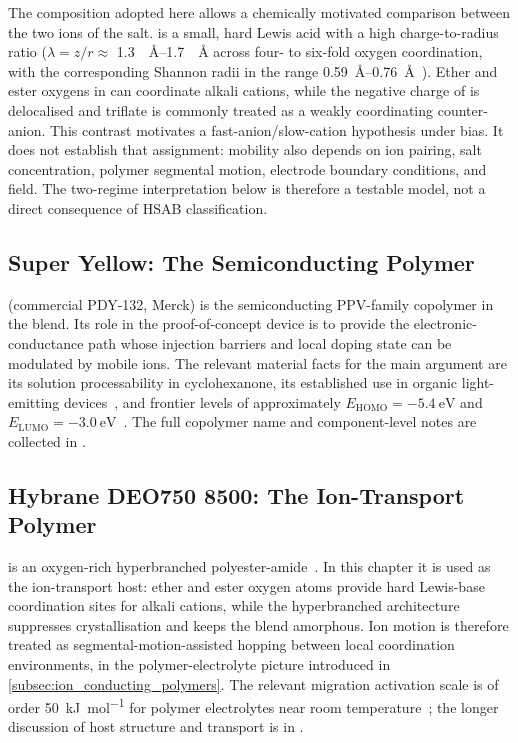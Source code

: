 \documentclass[12pt, twoside]{report}
\begin{document}
The composition adopted here allows a chemically motivated comparison between the two ions of the salt.  is a small, hard Lewis acid with a high charge-to-radius ratio (\(\lambda = z/r \approx\) \SIrange{1.3}{1.7}{\per\angstrom} across four- to six-fold oxygen coordination, with the corresponding Shannon radii in the range \SIrange{0.59}{0.76}{\angstrom}~\cite{Shannon1976}). Ether and ester oxygens in \Hybrane{} can coordinate alkali cations, while the negative charge of  is delocalised and triflate is commonly treated as a weakly coordinating counter-anion. This contrast motivates a fast-anion/slow-cation hypothesis under bias. It does not establish that assignment: mobility also depends on ion pairing, salt concentration, polymer segmental motion, electrode boundary conditions, and field. The two-regime interpretation below is therefore a testable model, not a direct consequence of HSAB classification.

\subsection{Super Yellow: The Semiconducting Polymer}\label{subsec:sy}

\SY{} (commercial PDY-132, Merck) is the semiconducting PPV-family copolymer in the blend. Its role in the proof-of-concept device is to provide the electronic-conductance path whose injection barriers and local doping state can be modulated by mobile ions. The relevant material facts for the main argument are its solution processability in cyclohexanone, its established use in organic light-emitting devices~\cite{Friend1999}, and frontier levels of approximately \(E_{\mathrm{HOMO}}=\SI{-5.4}{\electronvolt}\) and \(E_{\mathrm{LUMO}}=\SI{-3.0}{\electronvolt}\)~\cite{Zhang2015}. The full copolymer name and component-level notes are collected in .

\subsection{Hybrane DEO750 8500: The Ion-Transport Polymer}\label{subsec:hybrane}

\Hybrane{} is an oxygen-rich hyperbranched polyester-amide~\cite{Froehling2004}. In this chapter it is used as the ion-transport host: ether and ester oxygen atoms provide hard Lewis-base coordination sites for alkali cations, while the hyperbranched architecture suppresses crystallisation and keeps the blend amorphous. Ion motion is therefore treated as segmental-motion-assisted hopping between local coordination environments, in the polymer-electrolyte picture introduced in \cref{subsec:ion_conducting_polymers}. The relevant migration activation scale is of order \SI{50}{\kilo\joule\per\mol} for polymer electrolytes near room temperature~\cite{Gray1991}; the longer discussion of host structure and transport is in .
\end{document}
